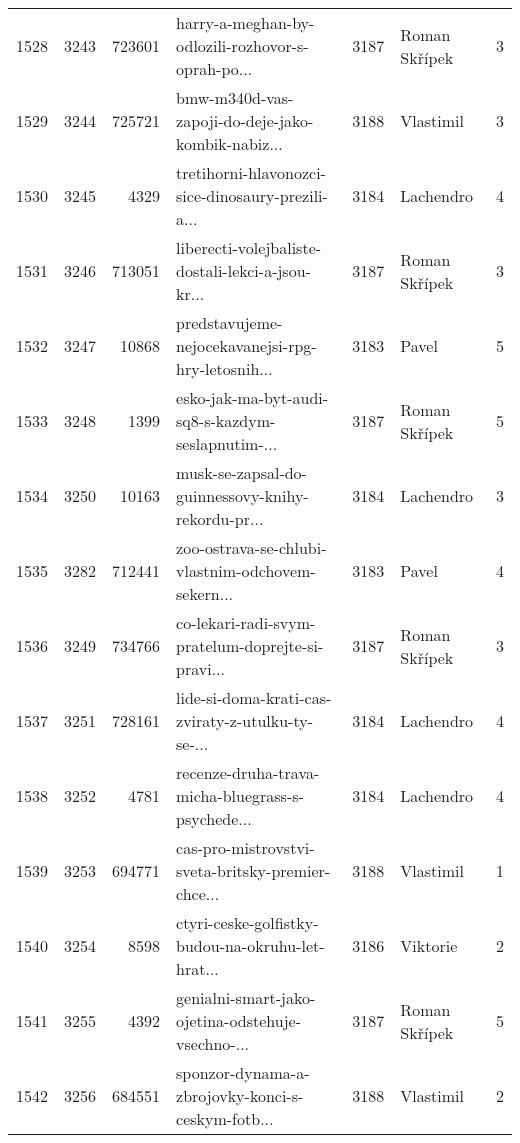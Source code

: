 \begin{tabular}{lrrlrlr}
1528 &       3243 &   723601 &  harry-a-meghan-by-odlozili-rozhovor-s-oprah-po... &     3187 &                Roman Skřípek &               3 \\
1529 &       3244 &   725721 &  bmw-m340d-vas-zapoji-do-deje-jako-kombik-nabiz... &     3188 &                    Vlastimil &               3 \\
1530 &       3245 &     4329 &  tretihorni-hlavonozci-sice-dinosaury-prezili-a... &     3184 &                    Lachendro &               4 \\
1531 &       3246 &   713051 &  liberecti-volejbaliste-dostali-lekci-a-jsou-kr... &     3187 &                Roman Skřípek &               3 \\
1532 &       3247 &    10868 &  predstavujeme-nejocekavanejsi-rpg-hry-letosnih... &     3183 &                        Pavel &               5 \\
1533 &       3248 &     1399 &  esko-jak-ma-byt-audi-sq8-s-kazdym-seslapnutim-... &     3187 &                Roman Skřípek &               5 \\
1534 &       3250 &    10163 &  musk-se-zapsal-do-guinnessovy-knihy-rekordu-pr... &     3184 &                    Lachendro &               3 \\
1535 &       3282 &   712441 &  zoo-ostrava-se-chlubi-vlastnim-odchovem-sekern... &     3183 &                        Pavel &               4 \\
1536 &       3249 &   734766 &  co-lekari-radi-svym-pratelum-doprejte-si-pravi... &     3187 &                Roman Skřípek &               3 \\
1537 &       3251 &   728161 &  lide-si-doma-krati-cas-zviraty-z-utulku-ty-se-... &     3184 &                    Lachendro &               4 \\
1538 &       3252 &     4781 &  recenze-druha-trava-micha-bluegrass-s-psychede... &     3184 &                    Lachendro &               4 \\
1539 &       3253 &   694771 &  cas-pro-mistrovstvi-sveta-britsky-premier-chce... &     3188 &                    Vlastimil &               1 \\
1540 &       3254 &     8598 &  ctyri-ceske-golfistky-budou-na-okruhu-let-hrat... &     3186 &                     Viktorie &               2 \\
1541 &       3255 &     4392 &  genialni-smart-jako-ojetina-odstehuje-vsechno-... &     3187 &                Roman Skřípek &               5 \\
1542 &       3256 &   684551 &  sponzor-dynama-a-zbrojovky-konci-s-ceskym-fotb... &     3188 &                    Vlastimil &               2 \\

\end{tabular}
